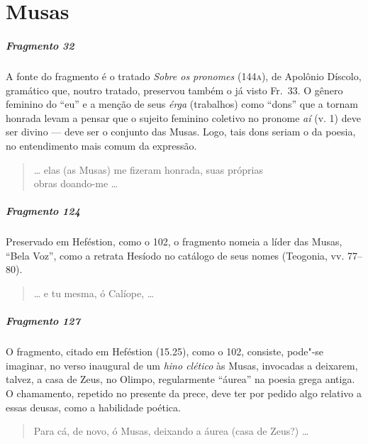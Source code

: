 {\chapter{Musas}

\paragraph{Fragmento 32}

{\small A fonte do fragmento é o tratado \textit{Sobre os pronomes} (144\textsc{a}), de Apolônio
Díscolo, gramático que, noutro tratado, preservou também o já visto Fr.~33. O
gênero feminino do “eu” e a menção de seus \textit{érga }(trabalhos) como
``dons” que a tornam honrada levam a pensar que o sujeito feminino
coletivo no pronome \textit{aí} (v. 1) deve ser divino --- deve ser o conjunto das Musas. Logo, tais dons
seriam o da poesia, no entendimento mais comum da expressão.}

\begin{verse}
\ldots{} elas (as Musas) me fizeram honrada, suas próprias\\
obras doando-me \ldots{}
\end{verse}

\paragraph{Fragmento 124}

{\small Preservado em Heféstion, como o 102, o fragmento nomeia a líder das Musas, ``Bela Voz'', como a retrata Hesíodo no catálogo de seus nomes (Teogonia, vv. 77--80).}

\begin{verse}
\ldots{} e tu mesma, ó Calíope, \ldots{}
\end{verse}


\paragraph{Fragmento 127}

{\small O fragmento, citado em Heféstion (15.25), como o 102, consiste, pode"-se imaginar, no
verso inaugural de um \textit{hino clético }às Musas, invocadas a deixarem,
talvez, a casa de Zeus, no Olimpo, regularmente ``áurea''
na poesia grega antiga. O chamamento, repetido no presente da prece, deve ter
por pedido algo relativo a essas deusas, como a habilidade poética.}

\begin{verse}
Para cá, de novo, ó Musas, deixando a áurea (casa \qb{}de Zeus?) \ldots{}
\end{verse}

}
